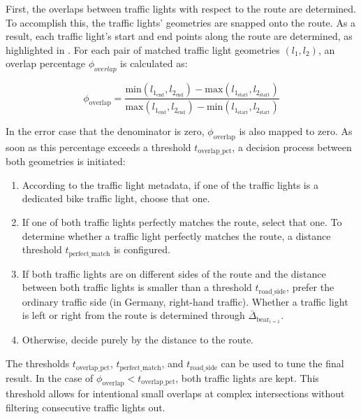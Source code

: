 First, the overlaps between traffic lights with respect to the route are determined. To accomplish this, the traffic lights' geometries are snapped onto the route. As a result, each traffic light's start and end points along the route are determined, as highlighted in . For each pair of matched traffic light geometries $(l_1, l_2)$, an overlap percentage $\phi_{overlap}$ is calculated as:

\begin{equation}
    \phi_{\text{overlap}} = \frac{\text{min}(l_{1_{\text{end}}}, l_{2_{\text{end}}}) - \text{max}(l_{1_{\text{start}}}, l_{2_{\text{start}}})}{\text{max}(l_{1_{\text{end}}}, l_{2_{\text{end}}}) - \text{min}(l_{1_{\text{start}}}, l_{2_{\text{start}}})}
\end{equation}

In the error case that the denominator is zero, $\phi_{\text{overlap}}$ is also mapped to zero. As soon as this percentage exceeds a threshold $t_{\text{overlap\_pct}}$, a decision process between both geometries is initiated:

\begin{enumerate}
    \item According to the traffic light metadata, if one of the traffic lights is a dedicated bike traffic light, choose that one.
    \item If one of both traffic lights perfectly matches the route, select that one. To determine whether a traffic light perfectly matches the route, a distance threshold $t_{\text{perfect\_match}}$ is configured.
    \item If both traffic lights are on different sides of the route and the distance between both traffic lights is smaller than a threshold $t_{\text{road\_side}}$, prefer the ordinary traffic side (in Germany, right-hand traffic). Whether a traffic light is left or right from the route is determined through $\bar{\Delta}_{\text{bear}_{i=1}}$.
    \item Otherwise, decide purely by the distance to the route.
\end{enumerate}

The thresholds $t_{\text{overlap\_pct}}$, $t_{\text{perfect\_match}}$, and $t_{\text{road\_side}}$ can be used to tune the final result. In the case of $\phi_{\text{overlap}} < t_{\text{overlap\_pct}}$, both traffic lights are kept. This threshold allows for intentional small overlaps at complex intersections without filtering consecutive traffic lights out.

